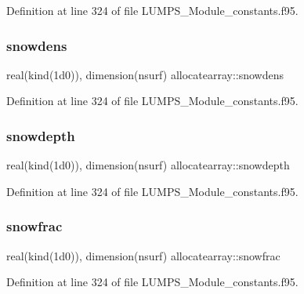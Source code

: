 Definition at line 324 of file L\+U\+M\+P\+S\+\_\+\+Module\+\_\+constants.\+f95.

\mbox{\label{namespaceallocatearray_ac7b06ad52874f40a2c456863ffa3d262}} 
\subsubsection{\texorpdfstring{snowdens}{snowdens}}
{\footnotesize\ttfamily real(kind(1d0)), dimension(nsurf) allocatearray\+::snowdens}



Definition at line 324 of file L\+U\+M\+P\+S\+\_\+\+Module\+\_\+constants.\+f95.

\mbox{\label{namespaceallocatearray_a2aa940f81b7bfe5c4815dd2d15e5c734}} 
\subsubsection{\texorpdfstring{snowdepth}{snowdepth}}
{\footnotesize\ttfamily real(kind(1d0)), dimension(nsurf) allocatearray\+::snowdepth}



Definition at line 324 of file L\+U\+M\+P\+S\+\_\+\+Module\+\_\+constants.\+f95.

\mbox{\label{namespaceallocatearray_afddcfa297d34e2f62378a4de75940afb}} 
\subsubsection{\texorpdfstring{snowfrac}{snowfrac}}
{\footnotesize\ttfamily real(kind(1d0)), dimension(nsurf) allocatearray\+::snowfrac}



Definition at line 324 of file L\+U\+M\+P\+S\+\_\+\+Module\+\_\+constants.\+f95.

\mbox{\label{namespaceallocatearray_af7e6a5b3ee785c8dda0fa0dc4c1ceb69}} 
